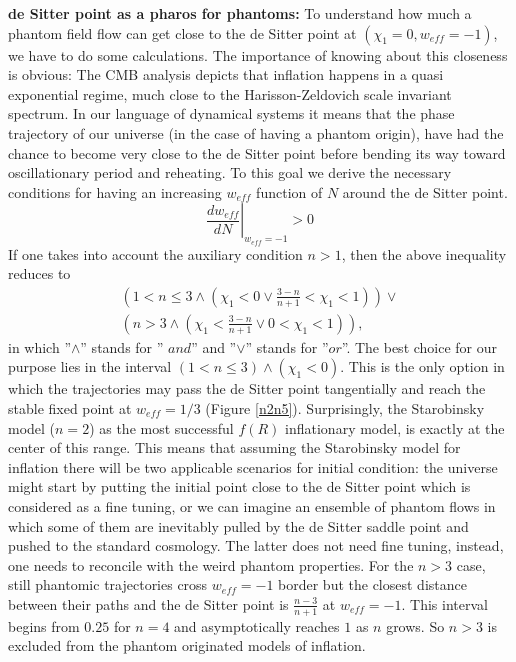 \documentclass[a4paper,11pt]{article}
\begin{document}
 \textbf{de Sitter point as a pharos for phantoms:  }
To understand how much a phantom field flow can get close to the de Sitter point at $(\chi_1=0,w_{eff}=-1)$, we have to do some calculations. The importance of knowing about this   closeness is obvious: The CMB analysis depicts that inflation happens in a quasi exponential regime, much close to the Harisson-Zeldovich scale invariant spectrum. In our language of dynamical systems it means that the phase trajectory of our universe (in the case of having a phantom origin), have had the chance to become very close to the de Sitter point before bending its way toward oscillationary period and reheating. To this goal we derive the necessary conditions for having an increasing $w_{eff}$ function of $N$ around the de Sitter point.
\begin{equation}
\left.\frac{d w_{eff}}{d N}\right|_{w_{eff}=-1}>0
\end{equation}
If one takes into account the auxiliary condition $n>1$, then the above inequality reduces to
\begin{equation}
\begin{aligned}
\left(1<n\leq 3\land \left(\chi_1<0\lor \frac{3-n}{n+1}<\chi_1<1\right)\right)\lor \\\left(n>3\land \left(\chi_1<\frac{3-n}{n+1}\lor 0<\chi_1<1\right)\right),
\end{aligned}
\end{equation}
in which ''$\land$'' stands for '' $and$'' and ''$\lor$'' stands for ''$or$''. 
The best choice for our purpose lies in the interval $(1<n\leq 3)\land (\chi_1<0)$. This is the only option in which the trajectories may pass the de Sitter point tangentially and reach the stable fixed point at $w_{eff}=1/3$ (Figure \ref{n2n5}). Surprisingly, the Starobinsky model ($n=2$) as the most successful $f(R)$ inflationary model, is exactly at the center of this range. This means that assuming the Starobinsky model for inflation there will be two applicable scenarios for initial condition: the universe might start by putting the initial point close to the de Sitter point which is considered as a fine tuning, or we can imagine an ensemble of phantom flows in which some of them are inevitably pulled by the de Sitter saddle point and pushed to the standard cosmology. The latter does not need fine tuning, instead, one needs to reconcile with the weird phantom properties. For the $n>3$ case, still phantomic trajectories cross $w_{eff}=-1$ border but the closest distance between their paths and the de Sitter point is $\frac{n-3}{n+1}$ at $w_{eff}=-1$. This interval begins from $0.25$ for $n=4$ and asymptotically reaches $1$ as $n$ grows. So $n>3$ is excluded from the phantom originated models of inflation. 
\end{document}
